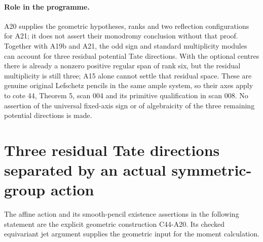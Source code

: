 \documentclass[11pt]{article}
\theoremstyle{remark}\newtheorem{remark}[theorem]{Remark}
\begin{document}
\paragraph{Role in the programme.}
A20 supplies the geometric hypotheses, ranks and
two reflection configurations for A21; it does not
assert their monodromy conclusion without that proof.
Together with A19b and A21, the odd sign and standard
multiplicity modules can account for three residual
potential Tate directions. With the optional centres
there is already a nonzero positive regular span of
rank six, but the residual multiplicity is still
three; A15 alone cannot settle that residual space.
These are genuine original Lefschetz pencils in
the same ample system, so their axes apply to
cote 44, Theorem 5, scan 004 and its primitive
qualification in scan 008. No assertion of the
universal fixed-axis sign or of algebraicity of
the three remaining potential directions is made.


\section{Three residual Tate directions separated by an actual symmetric-group action}
\label{sec:c44-a21}

The affine action and its smooth-pencil existence assertions in the following
statement are the explicit geometric construction C44-A20. Its checked
equivariant jet argument supplies the geometric input for the moment calculation.
\end{document}
